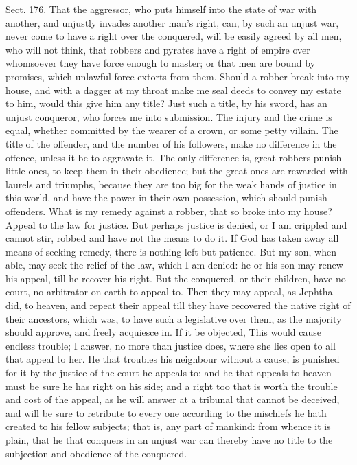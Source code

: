 \documentclass[11pt,openany]{book}
\begin{document}
Sect. 176. That the aggressor, who puts himself into the state of war with another, and unjustly invades another man's right, can, by such an unjust war, never come to have a right over the conquered, will be easily agreed by all men, who will not think, that robbers and pyrates have a right of empire over whomsoever they have force enough to master; or that men are bound by promises, which unlawful force extorts from them. Should a robber break into my house, and with a dagger at my throat make me seal deeds to convey my estate to him, would this give him any title? Just such a title, by his sword, has an unjust conqueror, who forces me into submission. The injury and the crime is equal, whether committed by the wearer of a crown, or some petty villain. The title of the offender, and the number of his followers, make no difference in the offence, unless it be to aggravate it. The only difference is, great robbers punish little ones, to keep them in their obedience; but the great ones are rewarded with laurels and triumphs, because they are too big for the weak hands of justice in this world, and have the power in their own possession, which should punish offenders. What is my remedy against a robber, that so broke into my house? Appeal to the law for justice. But perhaps justice is denied, or I am crippled and cannot stir, robbed and have not the means to do it. If God has taken away all means of seeking remedy, there is nothing left but patience. But my son, when able, may seek the relief of the law, which I am denied: he or his son may renew his appeal, till he recover his right. But the conquered, or their children, have no court, no arbitrator on earth to appeal to. Then they may appeal, as Jephtha did, to heaven, and repeat their appeal till they have recovered the native right of their ancestors, which was, to have such a legislative over them, as the majority should approve, and freely acquiesce in. If it be objected, This would cause endless trouble; I answer, no more than justice does, where she lies open to all that appeal to her. He that troubles his neighbour without a cause, is punished for it by the justice of the court he appeals to: and he that appeals to heaven must be sure he has right on his side; and a right too that is worth the trouble and cost of the appeal, as he will answer at a tribunal that cannot be deceived, and will be sure to retribute to every one according to the mischiefs he hath created to his fellow subjects; that is, any part of mankind: from whence it is plain, that he that conquers in an unjust war can thereby have no title to the subjection and obedience of the conquered.
\end{document}
